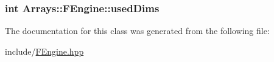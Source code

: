 \subsubsection[{used\+Dims}]{\setlength{\rightskip}{0pt plus 5cm}int Arrays\+::\+F\+Engine\+::used\+Dims\hspace{0.3cm}{\ttfamily [private]}}\label{classArrays_1_1FEngine_a9b0fe97f01e164bc78e3fd2d5c864949}


The documentation for this class was generated from the following file\+:\begin{DoxyCompactItemize}
\item 
include/\hyperlink{FEngine_8hpp}{F\+Engine.\+hpp}\end{DoxyCompactItemize}
